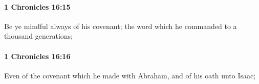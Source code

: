 		\paragraph{1 Chronicles 16:15} %
			\label{1CHRONICLES-16-15}

			Be ye mindful always of his covenant; the word which he commanded to a thousand generations;


		\paragraph{1 Chronicles 16:16} %
			\label{1CHRONICLES-16-16}

			Even of the covenant which he made with Abraham, and of his oath unto Isaac;


